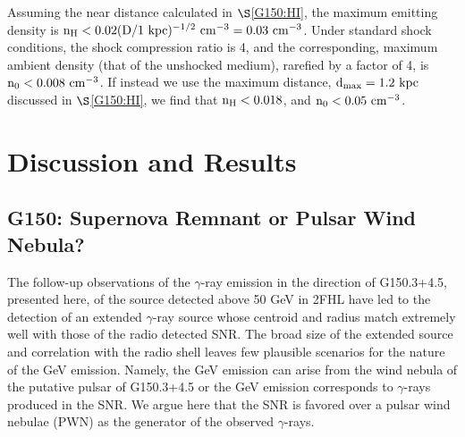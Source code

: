 \documentclass[iop]{emulateapj}
\newcommand{\kibitz}[2]{\ifnum\Comments=1\textcolor{#1}{#2}\fi}
\newcommand{\jamie}[1]{\kibitz{red}      {[JAM: #1]}}
\newcommand{\gam}{$\gamma$-ray}
\newcommand{\Gone}{G150.3+4.5}
\begin{document}
Assuming the near distance calculated in $\S$\ref{G150:HI}, the maximum emitting density is ${\rm n_H < 0.02 (D / 1~kpc)^{-1/2}~cm^{-3} = 0.03~cm^{-3}}$. Under standard shock conditions, the shock compression ratio  is 4, and the corresponding, maximum ambient density (that of the unshocked medium), rarefied by a factor of 4, is  ${\rm n_0 < 0.008~cm^{-3}}$. If instead we use the maximum distance,  ${\rm d_{max} = 1.2~kpc}$ discussed in $\S$\ref{G150:HI}, we find that  ${\rm n_{H} < 0.018}$, and ${\rm n_0 < 0.05~cm^{-3}}$.



%
%
\section{Discussion and Results}\label{G150:Discuss}
\subsection{G150: Supernova Remnant  or Pulsar Wind Nebula?}\label{G150:PWNvsSNR}

The follow-up observations of the \gam{} emission in the direction of \Gone{}, presented here, of the source detected above 50 GeV in 2FHL have led to the detection of an extended \gam{} source whose centroid and radius match extremely well with those of the radio detected SNR. The broad size of the extended source and correlation with the radio shell leaves few plausible scenarios for the nature of the GeV emission. Namely, the GeV emission can arise from the wind nebula of the putative pulsar of \Gone{} or the GeV emission corresponds to \gam{}s produced in the SNR. We argue here that the SNR is favored over a pulsar wind nebulae (PWN) as the generator of the observed \gam{}s.
\end{document}
